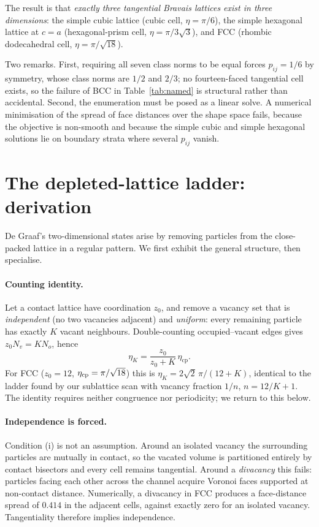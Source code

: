 \documentclass[aps,prl,twocolumn,superscriptaddress,floatfix]{revtex4-2}
\begin{document}
The result is that \emph{exactly three tangential Bravais lattices exist in three
dimensions}: the simple cubic lattice (cubic cell, $\eta=\pi/6$), the simple
hexagonal lattice at $c=a$ (hexagonal-prism cell, $\eta=\pi/3\sqrt{3}$), and FCC
(rhombic dodecahedral cell, $\eta=\pi/\sqrt{18}$).

Two remarks. First, requiring all seven class norms to be equal forces
$p_{ij}=1/6$ by symmetry, whose class norms are $1/2$ and $2/3$; no fourteen-faced
tangential cell exists, so the failure of BCC in Table~\ref{tab:named} is
structural rather than accidental. Second, the enumeration must be posed as a
linear solve. A numerical minimisation of the spread of face distances over the
shape space fails, because the objective is non-smooth and because the simple
cubic and simple hexagonal solutions lie on boundary strata where several
$p_{ij}$ vanish.

\section{The depleted-lattice ladder: derivation}
\label{sec:ladder}

De Graaf's two-dimensional states arise by removing particles from the
close-packed lattice in a regular pattern. We first exhibit the general
structure, then specialise.

\paragraph{Counting identity.} Let a contact lattice have coordination $z_0$,
and remove a vacancy set that is \emph{independent} (no two vacancies adjacent)
and \emph{uniform}: every remaining particle has exactly $K$ vacant neighbours.
Double-counting occupied--vacant edges gives $z_0 N_v = K N_o$, hence
\begin{equation}
\eta_K=\frac{z_0}{z_0+K}\,\eta_{\mathrm{cp}} .
\label{eq:counting}
\end{equation}
For FCC ($z_0=12$, $\eta_{\rm cp}=\pi/\sqrt{18}$) this is
$\eta_K = 2\sqrt2\,\pi/(12+K)$, identical to the ladder found by our
sublattice scan with vacancy fraction $1/n$, $n=12/K+1$. The identity requires
neither congruence nor periodicity; we return to this below.

\paragraph{Independence is forced.} Condition (i) is not an assumption.
Around an isolated vacancy the surrounding particles are mutually in contact,
so the vacated volume is partitioned entirely by contact bisectors and every
cell remains tangential. Around a \emph{divacancy} this fails: particles facing
each other across the channel acquire Voronoi faces supported at non-contact
distance. Numerically, a divacancy in FCC produces a face-distance spread of
$0.414$ in the adjacent cells, against exactly zero for an isolated vacancy.
Tangentiality therefore implies independence.
\end{document}
